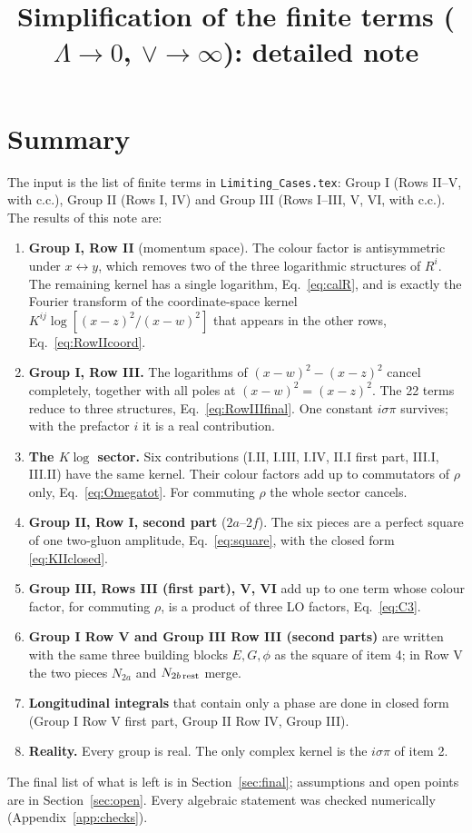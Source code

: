 \documentclass[10pt]{article}
\title{Simplification of the finite terms ($\Lambda\to0$, $\vee\to\infty$): detailed note}
\author{}
\date{}
\numberwithin{equation}{section}
\begin{document}
\maketitle
\tableofcontents

\section{Summary}

The input is the list of finite terms in \texttt{Limiting\_Cases.tex}: Group I (Rows II--V, with c.c.), Group II (Rows I, IV) and Group III (Rows I--III, V, VI, with c.c.). The results of this note are:

\begin{enumerate}
\item \textbf{Group I, Row II} (momentum space). The colour factor is antisymmetric under $x\leftrightarrow y$, which removes two of the three logarithmic structures of $R^{i}$. The remaining kernel has a single logarithm, Eq.~\eqref{eq:calR}, and is exactly the Fourier transform of the coordinate-space kernel $K^{ij}\log[(x-z)^{2}/(x-w)^{2}]$ that appears in the other rows, Eq.~\eqref{eq:RowIIcoord}.
\item \textbf{Group I, Row III.} The logarithms of $(x-w)^{2}-(x-z)^{2}$ cancel completely, together with all poles at $(x-w)^{2}=(x-z)^{2}$. The 22 terms reduce to three structures, Eq.~\eqref{eq:RowIIIfinal}. One constant $i\sigma\pi$ survives; with the prefactor $i$ it is a real contribution.
\item \textbf{The $K\log$ sector.} Six contributions (I.II, I.III, I.IV, II.I first part, III.I, III.II) have the same kernel. Their colour factors add up to commutators of $\rho$ only, Eq.~\eqref{eq:Omegatot}. For commuting $\rho$ the whole sector cancels.
\item \textbf{Group II, Row I, second part} ($2a$--$2f$). The six pieces are a perfect square of one two-gluon amplitude, Eq.~\eqref{eq:square}, with the closed form \eqref{eq:KIIclosed}.
\item \textbf{Group III, Rows III (first part), V, VI} add up to one term whose colour factor, for commuting $\rho$, is a product of three LO factors, Eq.~\eqref{eq:C3}.
\item \textbf{Group I Row V and Group III Row III (second parts)} are written with the same three building blocks $E,G,\phi$ as the square of item 4; in Row V the two pieces $N_{2a}$ and $N_{2b\,\rm rest}$ merge.
\item \textbf{Longitudinal integrals} that contain only a phase are done in closed form (Group I Row V first part, Group II Row IV, Group III).
\item \textbf{Reality.} Every group is real. The only complex kernel is the $i\sigma\pi$ of item 2.
\end{enumerate}
The final list of what is left is in Section~\ref{sec:final}; assumptions and open points are in Section~\ref{sec:open}. Every algebraic statement was checked numerically (Appendix~\ref{app:checks}).
\end{document}
